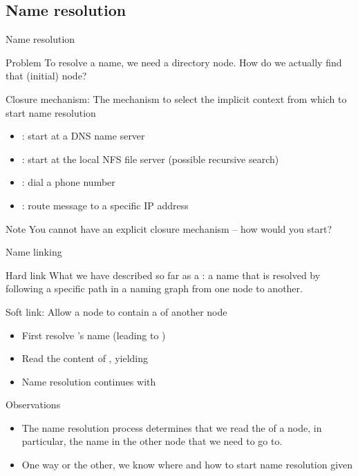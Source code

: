 \subsection{Name resolution}
\begin{slide}{Name resolution}
  \begin{alertblock}{Problem}
    To resolve a name, we need a directory node. How do we actually find that (initial) node?
  \end{alertblock}
  \begin{block}{Closure mechanism: The mechanism to select the implicit context from which to start name
      resolution}
    \begin{itemize}\tightlist
    \item {}: start at a DNS name server
    \item {}: start at the local NFS file server (possible recursive search)
    \item {}: dial a phone number
    \item {}: route message to a specific IP address
    \end{itemize}
  \end{block}
  \begin{block}{Note}
    You cannot have an explicit closure mechanism -- how would you start?
  \end{block}
\end{slide}
\begin{slide}{Name linking}
  \begin{block}{Hard link} 
    What we have described so far as a : a name that is resolved by following a specific path
    in a naming graph from one node to another.
  \end{block}
  \begin{block}{Soft link: Allow a node  to contain a  of another node}
    \begin{itemize}\tightlist
    \item First resolve 's name (leading to )
    \item Read the content of , yielding 
    \item Name resolution continues with 
    \end{itemize}
  \end{block}
  \begin{block}{Observations}
    \begin{itemize}\tightlist
    \item The name resolution process determines that we read the  of a node, in particular, the
      name in the other node that we need to go to.
    \item One way or the other, we know where and how to start name resolution given 
    \end{itemize}
  \end{block}
\end{slide}
